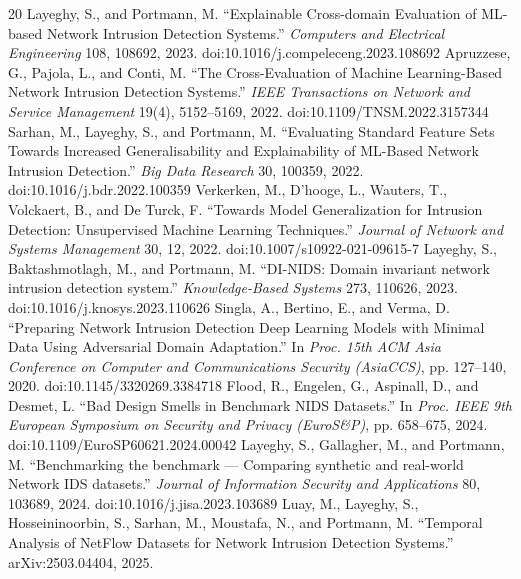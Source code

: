 \documentclass[journal]{IEEEtran}
\begin{document}
\begin{thebibliography}{20}
 Layeghy, S., and Portmann, M. ``Explainable Cross-domain Evaluation of ML-based Network Intrusion Detection Systems.'' \emph{Computers and Electrical Engineering} 108, 108692, 2023. doi:10.1016/j.compeleceng.2023.108692
 Apruzzese, G., Pajola, L., and Conti, M. ``The Cross-Evaluation of Machine Learning-Based Network Intrusion Detection Systems.'' \emph{IEEE Transactions on Network and Service Management} 19(4), 5152--5169, 2022. doi:10.1109/TNSM.2022.3157344
 Sarhan, M., Layeghy, S., and Portmann, M. ``Evaluating Standard Feature Sets Towards Increased Generalisability and Explainability of ML-Based Network Intrusion Detection.'' \emph{Big Data Research} 30, 100359, 2022. doi:10.1016/j.bdr.2022.100359
 Verkerken, M., D'hooge, L., Wauters, T., Volckaert, B., and De Turck, F. ``Towards Model Generalization for Intrusion Detection: Unsupervised Machine Learning Techniques.'' \emph{Journal of Network and Systems Management} 30, 12, 2022. doi:10.1007/s10922-021-09615-7
 Layeghy, S., Baktashmotlagh, M., and Portmann, M. ``DI-NIDS: Domain invariant network intrusion detection system.'' \emph{Knowledge-Based Systems} 273, 110626, 2023. doi:10.1016/j.knosys.2023.110626
 Singla, A., Bertino, E., and Verma, D. ``Preparing Network Intrusion Detection Deep Learning Models with Minimal Data Using Adversarial Domain Adaptation.'' In \emph{Proc. 15th ACM Asia Conference on Computer and Communications Security (AsiaCCS)}, pp. 127--140, 2020. doi:10.1145/3320269.3384718
 Flood, R., Engelen, G., Aspinall, D., and Desmet, L. ``Bad Design Smells in Benchmark NIDS Datasets.'' In \emph{Proc. IEEE 9th European Symposium on Security and Privacy (EuroS\&P)}, pp. 658--675, 2024. doi:10.1109/EuroSP60621.2024.00042
 Layeghy, S., Gallagher, M., and Portmann, M. ``Benchmarking the benchmark --- Comparing synthetic and real-world Network IDS datasets.'' \emph{Journal of Information Security and Applications} 80, 103689, 2024. doi:10.1016/j.jisa.2023.103689
 Luay, M., Layeghy, S., Hosseininoorbin, S., Sarhan, M., Moustafa, N., and Portmann, M. ``Temporal Analysis of NetFlow Datasets for Network Intrusion Detection Systems.'' arXiv:2503.04404, 2025.
\end{thebibliography}
\end{document}
